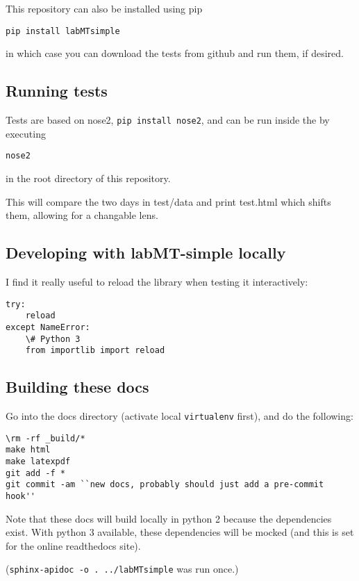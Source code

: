 This repository can also be installed using pip
\begin{lstlisting}
pip install labMTsimple
\end{lstlisting}

in which case you can download the tests from github and run them, if desired.


\subsection{Running tests}
\label{getting-started:running-tests}
Tests are based on nose2, \lstinline{pip install nose2}, and can be run inside the by executing
\begin{lstlisting}
nose2
\end{lstlisting}

in the root directory of this repository.

This will compare the two days in test/data and print test.html which shifts them, allowing for a changable lens.


\subsection{Developing with labMT-simple locally}
\label{getting-started:developing-with-labmt-simple-locally}
I find it really useful to reload the library when testing it interactively:
\begin{lstlisting}
try:
    reload
except NameError:
    \# Python 3
    from importlib import reload
\end{lstlisting}


\subsection{Building these docs}
\label{getting-started:building-these-docs}
Go into the docs directory (activate local \lstinline{virtualenv} first), and do the following:
\begin{lstlisting}
\rm -rf _build/*
make html
make latexpdf
git add -f *
git commit -am ``new docs, probably should just add a pre-commit hook''
\end{lstlisting}

Note that these docs will build locally in python 2 because the dependencies exist.
With python 3 available, these dependencies will be mocked (and this is set for the online readthedocs site).

(\lstinline{sphinx-apidoc -o . ../labMTsimple} was run once.)


